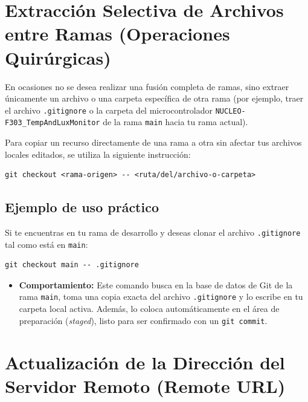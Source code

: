 \documentclass[
10pt, %
a4paper, %
oneside, %
headinclude,footinclude, %
BCOR5mm, %
]{scrartcl}
\begin{document}
\newpage
\section{Extracción Selectiva de Archivos entre Ramas (Operaciones Quirúrgicas)}

En ocasiones no se desea realizar una fusión completa de ramas, sino extraer únicamente un archivo o una carpeta específica de otra rama (por ejemplo, traer el archivo \texttt{.gitignore} o la carpeta del microcontrolador \texttt{NUCLEO-F303\_TempAndLuxMonitor} de la rama \texttt{main} hacia tu rama actual).

Para copiar un recurso directamente de una rama a otra sin afectar tus archivos locales editados, se utiliza la siguiente instrucción:

\begin{lstlisting}[language=DOS]
git checkout <rama-origen> -- <ruta/del/archivo-o-carpeta>
\end{lstlisting}

\subsection{Ejemplo de uso práctico}
Si te encuentras en tu rama de desarrollo y deseas clonar el archivo \texttt{.gitignore} tal como está en \texttt{main}:
\begin{lstlisting}[language=DOS]
git checkout main -- .gitignore
\end{lstlisting}

\begin{itemize}
	\item \textbf{Comportamiento:} Este comando busca en la base de datos de Git de la rama \texttt{main}, toma una copia exacta del archivo \texttt{.gitignore} y lo escribe en tu carpeta local activa. Además, lo coloca automáticamente en el área de preparación (\textit{staged}), listo para ser confirmado con un \texttt{git commit}.
\end{itemize}

\newpage
\section{Actualización de la Dirección del Servidor Remoto (Remote URL)}
\end{document}
